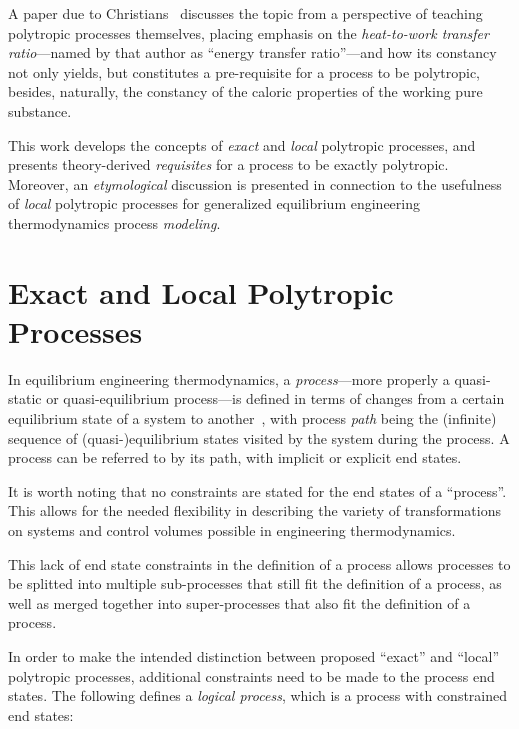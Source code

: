 \documentclass[10pt,a4paper]{article}
\begin{document}
\begin{multicols}{2}
    A paper due to Christians~\cite{2012-ChristiansJ-IntJMechEngEduc} discusses the topic from a
    perspective  of  teaching  polytropic  processes  themselves,  placing   emphasis   on   the
    \emph{heat-to-work transfer ratio}---named by that author as ``energy transfer ratio''---and
    how its constancy not only yields, but constitutes a  pre-requisite  for  a  process  to  be
    polytropic, besides, naturally, the constancy of the caloric properties of the working  pure
    substance.

    This work develops the concepts of \emph{exact} and \emph{local} polytropic  processes,  and
    presents theory-derived \emph{requisites} for a process to be exactly polytropic.  Moreover,
    an  \emph{etymological}  discussion  is  presented  in  connection  to  the  usefulness   of
    \emph{local} polytropic processes for  generalized  equilibrium  engineering  thermodynamics
    process \emph{modeling}.

\section{Exact and Local Polytropic Processes}

    In equilibrium engineering thermodynamics, a \emph{process}---more properly  a  quasi-static
    or quasi-equilibrium process---is defined in terms of changes  from  a  certain  equilibrium
    state of a system to  another~\cite{2013-CengelYA+BolesMA-AMGH},  with  process  \emph{path}
    being the (infinite) sequence of (quasi-)equilibrium states visited by the system during the
    process. A process can be referred to by its path, with implicit or explicit end states.

    It is worth noting that no constraints are stated for the end states of a ``process''.  This
    allows for the needed flexibility in describing the variety of  transformations  on  systems
    and control volumes possible in engineering thermodynamics.

    This lack of end state constraints in the definition of a process  allows  processes  to  be
    splitted into multiple sub-processes that still fit the definition of a process, as well as
    merged together into super-processes that also fit the definition of a process.

    In order  to  make  the  intended  distinction  between  proposed  ``exact''  and  ``local''
    polytropic processes, additional constraints need to be made to the process end states.  The
    following defines a \emph{logical process}, which is a process with constrained end states:


\end{multicols}
\end{document}
